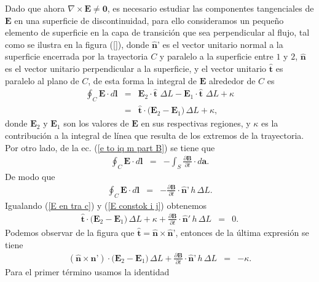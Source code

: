 Dado que ahora $\nabla\times\textbf{E}\neq \textbf{0}$, es necesario estudiar las componentes tangenciales de $\textbf{E}$ en una superficie de discontinuidad, para ello consideramos un peque\~no elemento de superficie en la capa de transición que sea perpendicular al flujo, tal como se ilustra en la figura (\ref{}), donde $\hat{\textbf{n}}\textbf{'}$ es el vector unitario normal a la superficie encerrada por la trayectoria $C$ y paralelo a la superficie entre $1$ y $2$, $\hat{\textbf{n}}$ es el vector unitario perpendicular a la  superficie, y el vector unitario $\hat{\textbf{t}}$ es paralelo al plano de $C$, de esta forma la integral de $\textbf{E}$ alrededor de $C$ es
\begin{eqnarray}
\oint_C\textbf{E}\cdot d\textbf{l}&=&\textbf{E}_2\cdot\hat{\textbf{t}}\,\,\Delta L-\textbf{E}_1\cdot\hat{\textbf{t}}\,\,\Delta L+ \kappa\nonumber\\
&=&\hat{\textbf{t}}\cdot\big(\textbf{E}_2-\textbf{E}_1\big)\,\Delta L+\kappa,\label{E en tra c}
\end{eqnarray}
donde $\textbf{E}_2$ y $\textbf{E}_1$ son los valores de $\textbf{E}$ en sus respectivas regiones, y $\kappa$ es la contribución a la integral de línea que resulta de los extremos de la trayectoria.
Por otro lado, de la ec. (\ref{e to iq m part B}) se tiene que
\begin{eqnarray}
\oint_C\textbf{E}\cdot d\textbf{l}&=&-\int_S\frac{\partial\textbf{B}}{\partial t}\cdot d\textbf{a}.
\end{eqnarray}
De modo que
\begin{eqnarray}
\oint_C\textbf{E}\cdot d\textbf{l}&=&-\frac{\partial\textbf{B}}{\partial t}\cdot\hat{\textbf{n}}\textbf{'}\,h\,\Delta L.\label{E constok i j}
\end{eqnarray}
Igualando (\ref{E en tra c}) y (\ref{E constok i j}) obtenemos
\begin{eqnarray}
\hat{\textbf{t}}\cdot\big(\textbf{E}_2-\textbf{E}_1\big)\,\Delta L+\kappa+\frac{\partial\textbf{B}}{\partial t}\cdot\hat{\textbf{n}}'\,h\,\Delta L&=&0.
\end{eqnarray}
Podemos observar de la figura que $\hat{\textbf{t}}=\hat{\textbf{n}}\times\hat{\textbf{n}}\textbf{'}$, entonces de la última expresión se tiene
\begin{eqnarray}
(\hat{\textbf{n}}\times\hat{\textbf{n}}\textbf{'})\cdot\big(\textbf{E}_2-\textbf{E}_1\big)\,\Delta L+\frac{\partial\textbf{B}}{\partial t}\cdot\hat{\textbf{n}}\textbf{'}\,h\,\Delta L&=&-\kappa.
\end{eqnarray}
Para el primer término usamos la identidad
